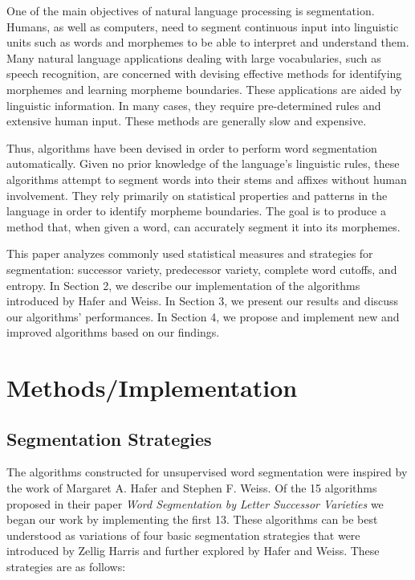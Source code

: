 \documentclass[11pt,letterpaper]{article}
\begin{document}
One of the main objectives of natural language processing is segmentation. Humans, as well as computers, need to segment continuous input into linguistic units such as words and morphemes to be able to interpret and understand them. Many natural language applications dealing with large vocabularies, such as speech recognition, are concerned with devising effective methods for identifying morphemes and learning morpheme boundaries. These applications are aided by linguistic information. In many cases, they require pre-determined rules and extensive human input. These methods are generally slow and expensive.\par
Thus, algorithms have been devised in order to perform word segmentation automatically. Given no prior knowledge of the language's linguistic rules, these algorithms attempt to segment words into their stems and affixes without human involvement. They rely primarily on statistical properties and patterns in the language in order to identify morpheme boundaries. The goal is to produce a method that, when given a word, can accurately segment it into its morphemes.\par
This paper analyzes commonly used statistical measures and strategies for segmentation: successor variety, predecessor variety, complete word cutoffs, and entropy. In Section 2, we describe our implementation of the algorithms introduced by Hafer and Weiss. In Section 3, we present our results and discuss our algorithms' performances. In Section 4, we propose and implement new and improved algorithms based on our findings. 

\section{Methods/Implementation}
\subsection{Segmentation Strategies}
The algorithms constructed for unsupervised word segmentation were inspired by the work of Margaret A. Hafer and Stephen F. Weiss. Of the 15 algorithms proposed in their paper \textit{Word Segmentation by Letter Successor Varieties} we began our work by implementing the first 13. These algorithms can be best understood as variations of four basic segmentation strategies that were introduced by Zellig Harris and further explored by Hafer and Weiss. These strategies are as follows:
\end{document}
